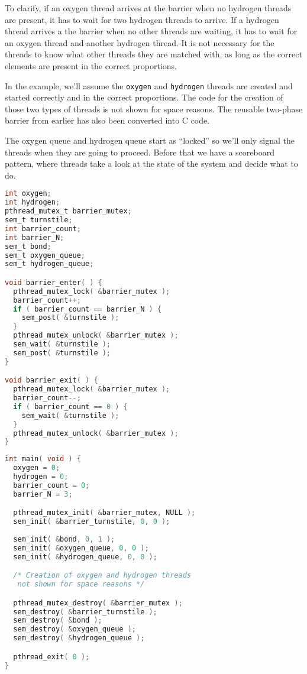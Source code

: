 To clarify, if an oxygen thread arrives at the barrier when no hydrogen threads are present, it has to wait for two hydrogen threads to arrive. If a hydrogen thread arrives a the barrier when no other threads are waiting, it has to wait for an oxygen thread and another hydrogen thread. It is not necessary for the threads to know what other threads they are matched with, as long as the correct elements are present in the correct proportions.

In the example, we'll assume the \texttt{oxygen} and \texttt{hydrogen} threads are created and started correctly and in the correct proportions. The code for the creation of those two types of threads is not shown for space reasons. The reusable two-phase barrier from earlier has also been converted into C code.

The oxygen queue and hydrogen queue start as ``locked'' so we'll only signal the threads when they are going to proceed. Before that we have a scoreboard pattern, where threads take a look at the state of the system and decide what to do.

\begin{multicols}{2}
	\begin{lstlisting}[firstline=0, language=C]
int oxygen;
int hydrogen;
pthread_mutex_t barrier_mutex;
sem_t turnstile;
int barrier_count;
int barrier_N;
sem_t bond;
sem_t oxygen_queue;
sem_t hydrogen_queue;

void barrier_enter( ) {
  pthread_mutex_lock( &barrier_mutex );
  barrier_count++;
  if ( barrier_count == barrier_N ) {
    sem_post( &turnstile );
  }
  pthread_mutex_unlock( &barrier_mutex );
  sem_wait( &turnstile );
  sem_post( &turnstile );            
}

void barrier_exit( ) {
  pthread_mutex_lock( &barrier_mutex );
  barrier_count--;
  if ( barrier_count == 0 ) {
    sem_wait( &turnstile );
  }
  pthread_mutex_unlock( &barrier_mutex );
}


\end{lstlisting}
	\columnbreak
	\begin{lstlisting}[language=C]
int main( void ) {
  oxygen = 0;
  hydrogen = 0;
  barrier_count = 0;
  barrier_N = 3;

  pthread_mutex_init( &barrier_mutex, NULL );
  sem_init( &barrier_turnstile, 0, 0 );
  
  sem_init( &bond, 0, 1 );
  sem_init( &oxygen_queue, 0, 0 );
  sem_init( &hydrogen_queue, 0, 0 ); 

  /* Creation of oxygen and hydrogen threads
   not shown for space reasons */

  pthread_mutex_destroy( &barrier_mutex );
  sem_destroy( &barrier_turnstile );
  sem_destroy( &bond );
  sem_destroy( &oxygen_queue );
  sem_destroy( &hydrogen_queue );   

  pthread_exit( 0 );
}

\end{lstlisting}
\end{multicols}

